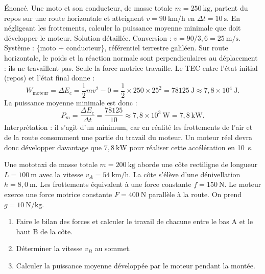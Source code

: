 \documentclass[11pt]{article}
\newcounter{popsec}
\newcounter{popsub}
\newcommand{\courssub}[1]{%
  \stepcounter{popsub}%
  \par\vspace{9pt}\noindent{\popxbold\fontsize{11.5}{13}\selectfont\color{popink}{\color{poporange}\thepopsec.\thepopsub}\hspace{6pt}#1}\par\nopagebreak\vspace{4pt}
}
\begin{document}
\begin{exoresolu}
Énoncé. Une moto et son conducteur, de masse totale $m = 250~\text{kg}$, partent du repos sur une route horizontale et atteignent $v = 90~\text{km/h}$ en $\Delta t = 10~\text{s}$. En négligeant les frottements, calculer la puissance moyenne minimale que doit développer le moteur.
\tcblower
Solution détaillée. Conversion : $v = 90/3{,}6 = 25~\text{m/s}$. Système : \{moto + conducteur\}, référentiel terrestre galiléen. Sur route horizontale, le poids et la réaction normale sont perpendiculaires au déplacement : ils ne travaillent pas. Seule la force motrice travaille. Le TEC entre l'état initial (repos) et l'état final donne :
\[ W_{\text{moteur}} = \Delta E_c = \frac{1}{2}mv^2 - 0 = \frac{1}{2}\times 250 \times 25^2 = \num{78125}~\text{J} \approx 7{,}8\times 10^4~\text{J}. \]
La puissance moyenne minimale est donc :
\[ P_m = \frac{\Delta E_c}{\Delta t} = \frac{\num{78125}}{10} \approx 7{,}8\times 10^3~\text{W} = 7{,}8~\text{kW}. \]
Interprétation : il s'agit d'un minimum, car en réalité les frottements de l'air et de la route consomment une partie du travail du moteur. Un moteur réel devra donc développer davantage que $7{,}8~\text{kW}$ pour réaliser cette accélération en 10~s.
\end{exoresolu}

\courssub{Exercice de synthèse}

\begin{exercice}
Une mototaxi de masse totale $m = 200~\text{kg}$ aborde une côte rectiligne de longueur $L = 100~\text{m}$ avec la vitesse $v_A = 54~\text{km/h}$. La côte s'élève d'une dénivellation $h = 8{,}0~\text{m}$. Les frottements équivalent à une force constante $f = 150~\text{N}$. Le moteur exerce une force motrice constante $F = 400~\text{N}$ parallèle à la route. On prend $g = 10~\text{N/kg}$.
\begin{enumerate}
\item Faire le bilan des forces et calculer le travail de chacune entre le bas A et le haut B de la côte.
\item Déterminer la vitesse $v_B$ au sommet.
\item Calculer la puissance moyenne développée par le moteur pendant la montée.
\end{enumerate}
\end{exercice}
\end{document}
